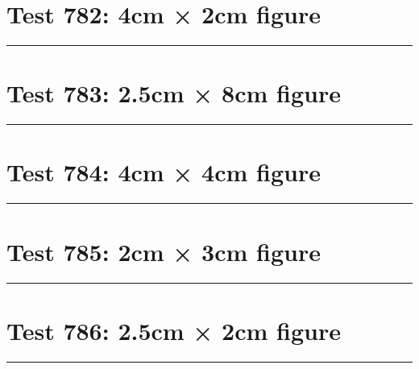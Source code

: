 \documentclass[a4paper,11pt]{article}
\begin{document}
\section*{Test 782: 4cm × 2cm figure}
\begin{swarmwrap}%
  \begin{minipage}[t]{4cm}
    \centering
    \rule{\linewidth}{2cm}
  \end{minipage}%
\end{swarmwrap}%
\swarmwrapnext
\lipsum[83]
\lipsum[84]
\lipsum[85]
\lipsum[86]
\lipsum[87]
\section*{Test 783: 2.5cm × 8cm figure}
\begin{swarmwrap}%
  \begin{minipage}[t]{2cm}
    \centering
    \rule{\linewidth}{8cm}
  \end{minipage}%
\end{swarmwrap}%
\swarmwrapnext
\lipsum[95]
\lipsum[96]
\lipsum[97]
\lipsum[98]
\lipsum[99]
\lipsum[100]
\section*{Test 784: 4cm × 4cm figure}
\begin{swarmwrap}%
  \begin{minipage}[t]{4cm}
    \centering
    \rule{\linewidth}{4cm}
  \end{minipage}%
\end{swarmwrap}%
\swarmwrapnext
\lipsum[20]
\lipsum[21]
\lipsum[22]
\lipsum[23]
\lipsum[24]
\lipsum[25]
\section*{Test 785: 2cm × 3cm figure}
\begin{swarmwrap}%
  \begin{minipage}[t]{2cm}
    \centering
    \rule{\linewidth}{3cm}
  \end{minipage}%
\end{swarmwrap}%
\swarmwrapnext
\lipsum[69]
\lipsum[70]
\lipsum[71]
\section*{Test 786: 2.5cm × 2cm figure}
\begin{swarmwrap}%
  \begin{minipage}[t]{2cm}
    \centering
    \rule{\linewidth}{2cm}
  \end{minipage}%
\end{swarmwrap}%
\swarmwrapnext
\lipsum[103]
\lipsum[104]
\lipsum[105]
\end{document}
